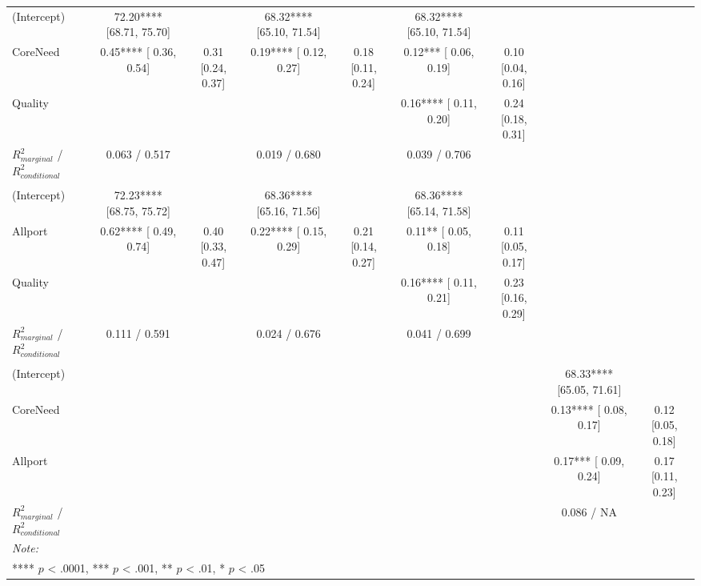 \begin{landscape}
\begin{table}
\begin{minipage}[t][\textheight][t]{\textwidth}
{\begin{tabular}[t]{lcccccccc}
\hspace{1em}(Intercept) & 72.20**** [68.71, 75.70] &  & 68.32**** [65.10, 71.54] &  & 68.32**** [65.10, 71.54] &  &  & \\
\hspace{1em}CoreNeed & 0.45**** [ 0.36,  0.54] & 0.31 [0.24, 0.37] & 0.19**** [ 0.12,  0.27] & 0.18 [0.11, 0.24] & 0.12*** [ 0.06,  0.19] & 0.10 [0.04, 0.16] &  & \\
\hspace{1em}Quality &  &  &  &  & 0.16**** [ 0.11,  0.20] & 0.24 [0.18, 0.31] &  & \\
\hspace{1em}$R^2_{marginal}$ / $R^2_{conditional}$ & 0.063 / 0.517 &  & 0.019 / 0.680 &  & 0.039 / 0.706 &  &  & \\
\addlinespace[0.3em]
\multicolumn{9}{l}{\textbf{Study 3: Allport}}\\
\hspace{1em}(Intercept) & 72.23**** [68.75, 75.72] &  & 68.36**** [65.16, 71.56] &  & 68.36**** [65.14, 71.58] &  &  & \\
\hspace{1em}Allport & 0.62**** [ 0.49,  0.74] & 0.40 [0.33, 0.47] & 0.22**** [ 0.15,  0.29] & 0.21 [0.14, 0.27] & 0.11** [ 0.05,  0.18] & 0.11 [0.05, 0.17] &  & \\
\hspace{1em}Quality &  &  &  &  & 0.16**** [ 0.11,  0.21] & 0.23 [0.16, 0.29] &  & \\
\hspace{1em}$R^2_{marginal}$ / $R^2_{conditional}$ & 0.111 / 0.591 &  & 0.024 / 0.676 &  & 0.041 / 0.699 &  &  & \\
\addlinespace[0.3em]
\multicolumn{9}{l}{\textbf{Study 3: Needs \& Allport}}\\
\hspace{1em}(Intercept) &  &  &  &  &  &  & 68.33**** [65.05, 71.61] & \\
\hspace{1em}CoreNeed &  &  &  &  &  &  & 0.13**** [ 0.08,  0.17] & 0.12 [0.05, 0.18]\\
\hspace{1em}Allport &  &  &  &  &  &  & 0.17*** [ 0.09,  0.24] & 0.17 [0.11, 0.23]\\
\hspace{1em}$R^2_{marginal}$ / $R^2_{conditional}$ &  &  &  &  &  &  & 0.086 / NA & \\
\bottomrule
\multicolumn{9}{l}{\rule{0pt}{1em}\textit{Note: }}\\
\multicolumn{9}{l}{\rule{0pt}{1em}**** $p$ < .0001, *** $p$ < .001, ** $p$ < .01, * $p$ < .05}\\
\end{tabular}}
\end{minipage}
\end{table}
\end{landscape}
